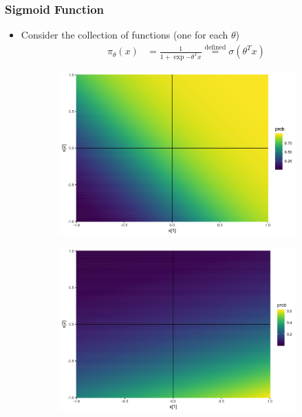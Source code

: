\documentclass[10pt,mathserif]{beamer}
\begin{document}
\begin{frame}
  \frametitle{Sigmoid Function}
  \begin{itemize}
  \item Consider the collection of functions (one for each $\theta$)
    \begin{align*}
      \pi_{\theta}\left(x\right) &= \frac{1}{1 + \exp{-\theta^{T}x}} \stackrel{\text{defined}}{=}\sigma\left(\theta^{T}x\right)
    \end{align*}
  \end{itemize}
  \begin{figure}
    \begin{subfigure}{.17\paperwidth}
      \centering
      \includegraphics[width=0.17\paperwidth]{figure/sigmoid_plot_1}
    \end{subfigure}
    \begin{subfigure}{.17\paperwidth}
      \centering
      \includegraphics[width=0.17\paperwidth]{figure/sigmoid_plot_2}

\end{subfigure}
\end{figure}
\end{frame}
\end{document}
